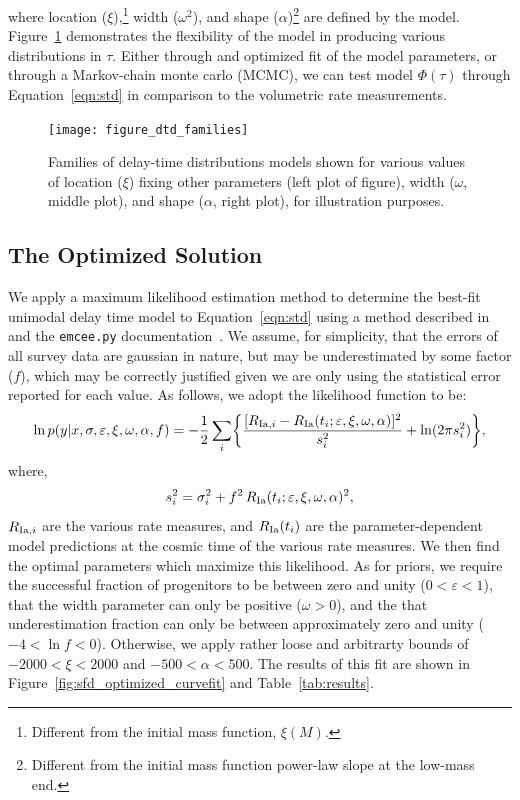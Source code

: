 \documentclass[apj]{aastex62}
\begin{document}
\noindent where location ($\xi$),\footnote{Different from the initial mass function, $\xi(M)$.} width ($\omega^2$), and shape ($\alpha$)\footnote{Different from the initial mass function power-law slope at the low-mass end.} are defined by the model. Figure~\ref{fig:dtd_families} demonstrates the flexibility of the model in producing various distributions in $\tau$. Either through and optimized fit of the model parameters, or through a Markov-chain monte carlo (MCMC), we can test model $\Phi(\tau)$ through Equation~\ref{eqn:std} in comparison to the volumetric rate measurements.

\begin{figure}[t]
   \centering
   \texttt{[image: figure\_dtd\_families]}
   \caption{\footnotesize Families of delay-time distributions models shown for various values of location ($\xi$) fixing other parameters (left plot of figure), width ($\omega$, middle plot), and shape ($\alpha$, right plot), for illustration purposes.}
   \label{fig:dtd_families}
\end{figure}


\subsection{The Optimized Solution\label{sec:optimized_soln}}
We apply a maximum likelihood estimation method to determine the best-fit unimodal delay time model to Equation~\ref{eqn:std} using a method described in \cite{Hogg:2010fj} and the {\tt emcee.py} documentation~\citep{Foreman-Mackey:2013pd}. We assume, for simplicity, that the errors of all survey data are gaussian in nature, but may be underestimated by some factor ($f$), which may be correctly justified given we are only using the statistical error reported for each value.  As follows, we adopt the likelihood function to be:
\begin{equation}
\ln p(y|x, \sigma, \varepsilon, \xi, \omega, \alpha, f) = -\frac{1}{2} \sum_i \biggl\{ \frac{[R_{{\rm Ia},i} - R_{\rm Ia}(t_i; \varepsilon, \xi, \omega, \alpha)]^2}{s_i^2}+\ln (2\pi s_i^2)\biggr\},
	\label{eqn:lf}
\end{equation}
where,
\begin{equation}
s_i^2 = \sigma_i^2+f^2\, R_{\rm Ia}(t_i; \varepsilon, \xi, \omega, \alpha)^2,
\end{equation}
\noindent $R_{{\rm Ia},i}$ are the various rate measures, and $R_{\rm Ia}(t_i)$ are the parameter-dependent model predictions at the cosmic time of the various rate measures. We then find the optimal parameters which maximize this likelihood. As for priors, we require the successful fraction of progenitors to be between zero and unity ($0<\varepsilon<1$), that the width parameter can only be positive ($\omega>0$), and the that underestimation fraction can only be between approximately zero and unity ($-4<\ln f<0$). Otherwise, we apply rather loose and arbitrarty bounds of $-2000<\xi<2000$ and  $-500 < \alpha < 500$. The results of this fit are shown in Figure~\ref{fig:sfd_optimized_curvefit} and Table~\ref{tab:results}. 
\end{document}
